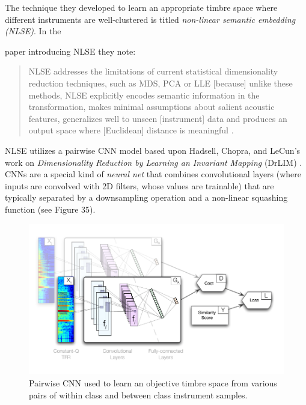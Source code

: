 \documentclass[12pt]{report} 	%
\numberwithin{figure}{chapter}
\numberwithin{table}{chapter}
\numberwithin{equation}{chapter}
\begin{document}
\begin{flushleft}
The technique they developed to learn an appropriate timbre space where different instruments are well-clustered is titled \textit{non-linear semantic embedding (NLSE)}. In the 
\begin{singlespace} 
\noindent paper introducing NLSE they note:
\begin{quote}
NLSE addresses the limitations of current statistical dimensionality reduction techniques, such as MDS, PCA or LLE [because] unlike these methods, NLSE explicitly encodes semantic information in the transformation, makes minimal assumptions about salient acoustic features, generalizes well to unseen [instrument] data and produces an output space where [Euclidean] distance is meaningful \cite[p. 1]{Humphrey:2000th}.
\end{quote}
\end{singlespace}
NLSE utilizes a pairwise CNN model based upon Hadsell, Chopra, and LeCun's work on \textit{Dimensionality Reduction by Learning an Invariant Mapping} (DrLIM) \cite{hadsell2006dimensionality}. CNNs are a special kind of \textit{neural net} that combines convolutional layers (where inputs are convolved with 2D filters, whose values are trainable) that are typically separated by a downsampling operation and a non-linear squashing function (see Figure 35). 
\begin{figure}[h!]
\begin{center}
\includegraphics[scale=0.95]{PairwiseCNN}
\caption[Pairwise CNN architecture]{Pairwise CNN used to learn an objective timbre space from various pairs of within class and between class instrument samples.}
\end{center}
\vspace{6pt}
\end{figure}

\end{flushleft}
\end{document}
